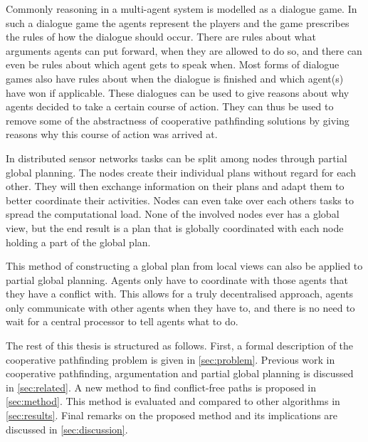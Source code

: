Commonly reasoning in a multi-agent system is modelled as a dialogue game. In
such a dialogue game the agents represent the players and the game prescribes
the rules of how the dialogue should occur. There are rules about what
arguments agents can put forward, when they are allowed to do so, and there can
even be rules about which agent gets to speak when. Most forms of dialogue
games also have rules about when the dialogue is finished and which agent(s)
have won if applicable. These dialogues can be used to give reasons about why
agents decided to take a certain course of action. They can thus be used to
remove some of the abstractness of cooperative pathfinding solutions by giving
reasons why this course of action was arrived at.

In distributed sensor networks tasks can be split among nodes through partial
global planning. The nodes create their individual plans without regard for
each other. They will then exchange information on their plans and adapt them
to better coordinate their activities. Nodes can even take over each others
tasks to spread the computational load. None of the involved nodes ever has a
global view, but the end result is a plan that is globally coordinated with
each node holding a part of the global plan.

This method of constructing a global plan from local views can also be applied
to partial global planning. Agents only have to coordinate with those agents
that they have a conflict with. This allows for a truly decentralised approach,
agents only communicate with other agents when they have to, and there is no
need to wait for a central processor to tell agents what to do.


The rest of this thesis is structured as follows. First, a formal description
of the cooperative pathfinding problem is given in \autoref{sec:problem}.
Previous work in cooperative pathfinding, argumentation and partial global
planning is discussed in \autoref{sec:related}. A new method to find
conflict-free paths is proposed in \autoref{sec:method}. This method is
evaluated and compared to other algorithms in \autoref{sec:results}. Final
remarks on the proposed method and its implications are discussed in
\autoref{sec:discussion}.
